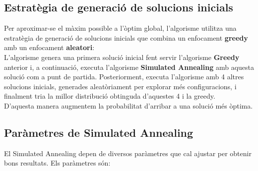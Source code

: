 \documentclass[a4paper,12pt]{report}
\begin{document}
\begin{itemize}
\begin{algorithm}[H]
{		}
\end{algorithm}

\newpage

\subsection{Estratègia de generació de solucions inicials}
Per aproximar-se el màxim possible a l'òptim global, l'algorisme utilitza una estratègia de generació de solucions inicials que combina un enfocament \textbf{greedy} amb un enfocament \textbf{aleatori}:\\
L'algorisme genera una primera solució inicial fent servir l'algorisme \textbf{Greedy} anterior i, a continuació, executa l'algorisme \textbf{Simulated Annealing} amb aquesta solució com a punt de partida.
Posteriorment, executa l'algorisme amb 4 altres solucions inicials, generades aleatòriament per explorar més configuracions, i finalment tria la millor distribució obtinguda d'aquestes 4 i la greedy.\\
D'aquesta manera augmentem la probabilitat d'arribar a una solució més òptima.

\subsection{Paràmetres de Simulated Annealing}

El Simulated Annealing depen de diversos paràmetres que cal ajustar per obtenir bons resultats. Els paràmetres són:


\end{itemize}
\end{document}
